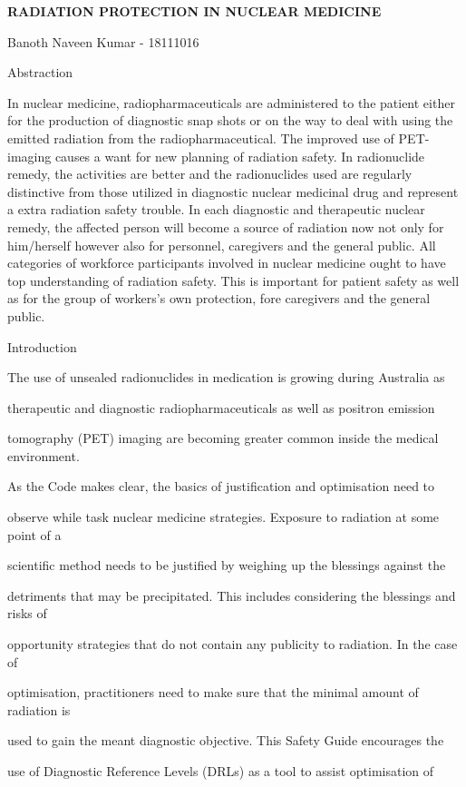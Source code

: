 \documentclass[
]{article}
\author{}
\date{}
\begin{document}
\textbf{RADIATION PROTECTION IN NUCLEAR MEDICINE}

Banoth Naveen Kumar - 18111016

Abstraction

In nuclear medicine, radiopharmaceuticals are administered to the
patient either for the production of diagnostic snap shots or on the way
to deal with using the emitted radiation from the radiopharmaceutical.
The improved use of PET-imaging causes a want for new planning of
radiation safety. In radionuclide remedy, the activities are better and
the radionuclides used are regularly distinctive from those utilized in
diagnostic nuclear medicinal drug and represent a extra radiation safety
trouble. In each diagnostic and therapeutic nuclear remedy, the affected
person will become a source of radiation now not only for him/herself
however also for personnel, caregivers and the general public. All
categories of workforce participants involved in nuclear medicine ought
to have top understanding of radiation safety. This is important for
patient safety as well as for the group of workers's own protection,
fore caregivers and the general public.

Introduction

The use of unsealed radionuclides in medication is growing during
Australia as

therapeutic and diagnostic radiopharmaceuticals as well as positron
emission

tomography (PET) imaging are becoming greater common inside the medical
environment.

As the Code makes clear, the basics of justification and optimisation
need to

observe while task nuclear medicine strategies. Exposure to radiation at
some point of a

scientific method needs to be justified by weighing up the blessings
against the

detriments that may be precipitated. This includes considering the
blessings and risks of

opportunity strategies that do not contain any publicity to radiation.
In the case of

optimisation, practitioners need to make sure that the minimal amount of
radiation is

used to gain the meant diagnostic objective. This Safety Guide
encourages the

use of Diagnostic Reference Levels (DRLs) as a tool to assist
optimisation of
\end{document}
